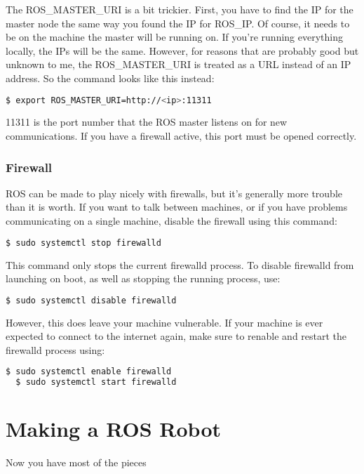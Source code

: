 The ROS\_MASTER\_URI is a bit trickier. First, you have to find the IP for the master node the same way you found the IP for ROS\_IP. Of course, it needs to be on the machine the master will be running on. If you're running everything locally, the IPs will be the same. However, for reasons that are probably good but unknown to me, the ROS\_MASTER\_URI is treated as a URL instead of an IP address. So the command looks like this instead:

\begin{lstlisting}[language=bash]
  $ export ROS_MASTER_URI=http://<ip>:11311
\end{lstlisting} 

11311 is the port number that the ROS master listens on for new communications. If you have a firewall active, this port must be opened correctly.

\subsubsection{Firewall}

ROS can be made to play nicely with firewalls, but it's generally more trouble than it is worth. If you want to talk between machines, or if you have problems communicating on a single machine, disable the firewall using this command:

\begin{lstlisting}[language=bash]
  $ sudo systemctl stop firewalld
\end{lstlisting}

This command only stops the current firewalld process. To disable firewalld from launching on boot, as well as stopping the running process, use:

\begin{lstlisting}[language=bash]
  $ sudo systemctl disable firewalld
\end{lstlisting} 

However, this does leave your machine vulnerable. If your machine is ever expected to connect to the internet again, make sure to renable and restart the firewalld process using:

\begin{lstlisting}[language=bash]
  $ sudo systemctl enable firewalld
  $ sudo systemctl start firewalld
\end{lstlisting} 

\section{Making a ROS Robot}

Now you have most of the pieces



